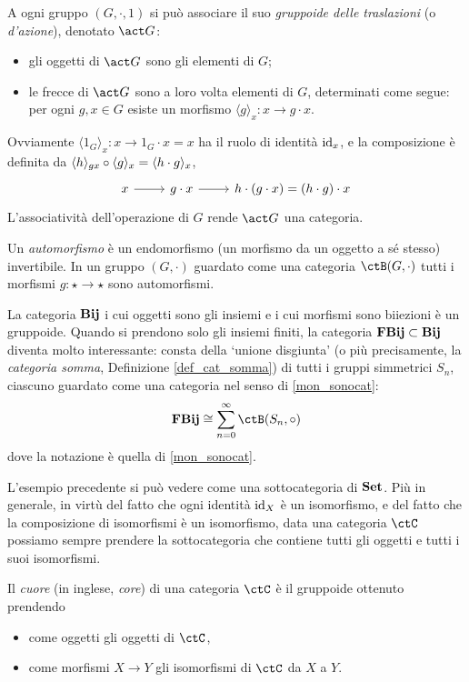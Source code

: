 \begin{example}\label{action_groupoid}
	A ogni gruppo \((G,\cdot,1)\) si può associare il suo \emph{gruppoide delle traslazioni} (o \emph{d'azione}), denotato \(\act G\):
	\begin{itemize}
		\item gli oggetti di \(\act G\) sono gli elementi di \(G\);
		\item le frecce di \(\act G\) sono a loro volta elementi di \(G\), determinati come segue: per ogni \(g,x\in G\) esiste un morfismo \(\langle g\rangle_x : x\to g\cdot x\).
	\end{itemize}
	Ovviamente \(\langle 1_G\rangle_x : x \to 1_G\cdot x=x\) ha il ruolo di identità \(\mathrm{id}_x\), e la composizione è definita da \(\langle h\rangle_{gx}\circ \langle g\rangle_x = \langle h\cdot g\rangle_x\),
	\[\begin{tikzcd}
			x \ar[r] & g\cdot x \ar[r] & h\cdot (g\cdot x) = (h\cdot g)\cdot x
		\end{tikzcd}\]
	L'associatività dell'operazione di \(G\) rende \(\act G\) una categoria.
\end{example}
\begin{definition}
	Un \emph{automorfismo} è un endomorfismo (un morfismo da un oggetto a sé stesso) invertibile. In un gruppo \((G,\cdot)\) guardato come una categoria \(\ctB(G,\cdot)\) tutti i morfismi \(g : \star\to\star\) sono automorfismi.
\end{definition}

\begin{example}\label{ex_cat_gruppoide_naturali}
	La categoria \(\mathbf{Bij}\) i cui oggetti sono gli insiemi e i cui morfismi sono biiezioni è un gruppoide. Quando si prendono solo gli insiemi finiti, la categoria \(\mathbf{FBij}\subset\mathbf{Bij}\) diventa molto interessante: consta della `unione disgiunta' (o più precisamente, la \emph{categoria somma}, Definizione \ref{def_cat_somma}) di tutti i gruppi simmetrici \(S_n\), ciascuno guardato come una categoria nel senso di \ref{mon_sonocat}:
	\[\cate{FBij}\cong \sum_{n=0}^\infty \ctB(S_n,\cmp)\]
	dove la notazione è quella di \ref{mon_sonocat}.
\end{example}

L'esempio precedente si può vedere come una sottocategoria di \(\mathbf{Set}\).
Più in generale, in virtù del fatto che ogni identità \(\mathrm{id}_X\) è un isomorfismo, e del fatto che la composizione di isomorfismi è un isomorfismo, data una categoria \(\ctC\) possiamo sempre prendere la sottocategoria che contiene tutti gli oggetti e tutti i suoi isomorfismi.
\begin{definition}\label{def_cuore}
  Il \emph{cuore} (in inglese, \emph{core}) di una categoria \(\ctC\) è il gruppoide ottenuto prendendo
	\begin{itemize}
		\item come oggetti gli oggetti di \(\ctC\),
		\item come morfismi \(X\to Y\) gli isomorfismi di \(\ctC\) da \(X\) a \(Y\).
	\end{itemize}
\end{definition}


